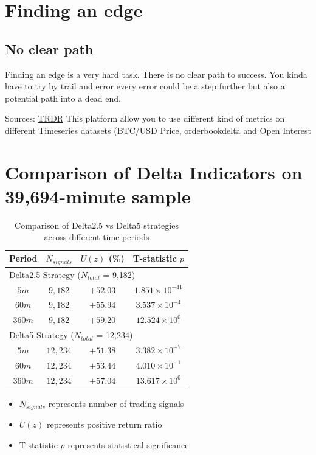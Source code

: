 \documentclass[12pt]{article}
\begin{document}
\section*{Finding an edge}
\subsection*{No clear path}
Finding an edge is a very hard task. There is no clear path to success. You kinda have to try by trail and error every error could be a step further but also a potential path into a dead end.
  

\newpage



Sources:
\href{https://trdr.io/}{TRDR} This platform allow you to use different kind of metrics on different Timeseries datasets (BTC/USD Price, orderbookdelta  and Open Interest

\newpage
\section{Comparison of Delta Indicators on 39,694-minute sample}

\begin{table}[h]
\begin{tabular}{cccc}
\hline
Period & $N_{signals}$ & $U(z)$ (\%) & T-statistic $p$ \\
\hline
\multicolumn{4}{l}{Delta2.5 Strategy ($N_{total}$ = 9,182)} \\
\hline
  $5m$ & $9,182$ & $+52.03$ & $1.851 \times 10^{-41}$ \\
  $60m$ & $9,182$ & $+55.94$ & $3.537 \times 10^{-4}$ \\
  $360m$ & $9,182$ & $+59.20$ & $12.524 \times 10^{0}$ \\
  \hline
  \multicolumn{4}{l}{Delta5 Strategy ($N_{total}$ = 12,234)} \\
  \hline
  $5m$ & $12,234$ & $+51.38$ & $3.382 \times 10^{-7}$ \\
  $60m$ & $12,234$ & $+53.44$ & $4.010 \times 10^{-1}$ \\
  $360m$ & $12,234$ & $+57.04$ & $13.617 \times 10^{0}$ \\
\hline
\end{tabular}
\caption{Comparison of Delta2.5 vs Delta5 strategies across different time periods}
\end{table}

\begin{itemize}
  \item $N_{signals}$ represents number of trading signals
  \item $U(z)$ represents positive return ratio
  \item T-statistic $p$ represents statistical significance
\end{itemize}
\end{document}
